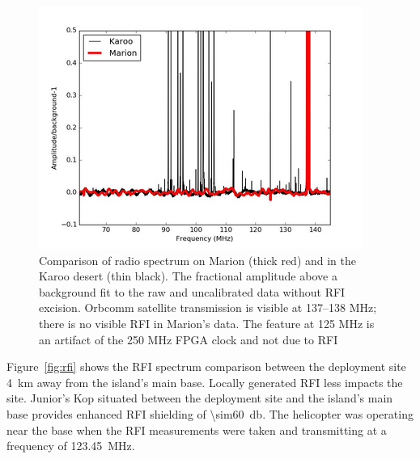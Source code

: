 \begin{figure}
	\centering
	\includegraphics[width=\linewidth]{Figures/karoo}
	\caption{Comparison of radio spectrum on Marion (thick red) and in the Karoo desert (thin black). The fractional amplitude above a background fit to the raw and uncalibrated data without RFI excision. Orbcomm satellite transmission is visible at 137–138 MHz; there is no visible RFI in Marion's data. The feature at 125 MHz is an artifact of the 250 MHz FPGA clock and not due to RFI~\citep{2019JAI.....850004P}}
	\label{fig:karoo}
\end{figure}

Figure~\ref{fig:rfi} shows the RFI spectrum comparison between the \prizm deployment site \SI{4}{\kilo\metre} away from the island's main base. Locally generated RFI less impacts the \prizm site. Junior's Kop situated between the deployment site and the island's main base provides enhanced RFI shielding of \SI{\sim60}{\decibel}. The helicopter was operating near the base when the RFI measurements were taken and transmitting at a frequency of \SI{123.45}{\mega\hertz}.

